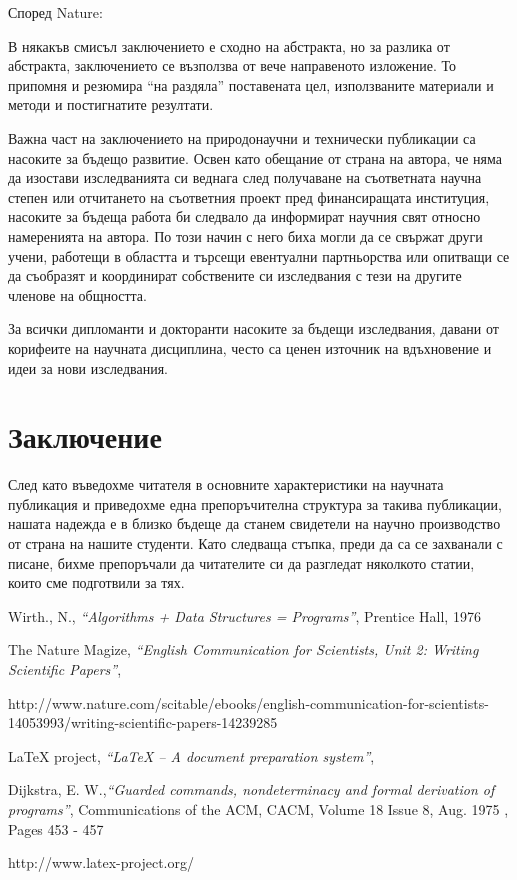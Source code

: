 \documentclass[11pt, oneside]{article}     %
\begin{document}
Според Nature:\\

В някакъв смисъл заключението е сходно на абстракта, но за разлика от абстракта, заключението се възползва от вече направеното изложение. То припомня и  резюмира ``на раздяла'' поставената цел, използваните материали и методи и постигнатите резултати.

Важна част на заключението на природонаучни и технически публикации са насоките за бъдещо развитие. Освен като обещание от страна на автора, че няма да изостави изследванията си веднага след получаване на съответната научна степен или отчитането на съответния проект пред финансиращата институция, насоките за бъдеща работа би следвало да информират научния свят относно намеренията на автора. По този начин с него биха могли да се свържат други учени, работещи в областта и търсещи евентуални партньорства или опитващи се да съобразят и координират собствените си изследвания с тези на другите членове на общността. 

За всички дипломанти и докторанти насоките за бъдещи изследвания, давани от корифеите на научната дисциплина, често са ценен източник на вдъхновение и идеи за нови изследвания.

\section{Заключение}

След като въведохме читателя в основните характеристики на научната публикация и приведохме една препоръчителна структура за такива публикации, нашата надежда е в близко бъдеще да станем свидетели на научно производство от страна на нашите студенти. Като следваща стъпка, преди да са се захванали с писане, бихме препоръчали да читателите си да разгледат няколкото статии, които сме подготвили за тях.


\begin{thebibliography}{99}



 Wirth., N., \emph{``Algorithms + Data Structures = Programs''},  Prentice Hall, 1976

 The Nature Magize, \emph{``English Communication for Scientists, Unit 2:  Writing Scientific Papers''},  

http://www.nature.com/scitable/ebooks/english-communication-for-scientists-14053993/writing-scientific-papers-14239285

 LaTeX project, \emph{``LaTeX – A document preparation system''},


 Dijkstra, E. W.,\emph{``Guarded commands, nondeterminacy and formal derivation of programs''},  Communications of the ACM, CACM, Volume 18 Issue 8, Aug. 1975 , Pages 453 - 457

http://www.latex-project.org/

\end{thebibliography}
\end{document}
